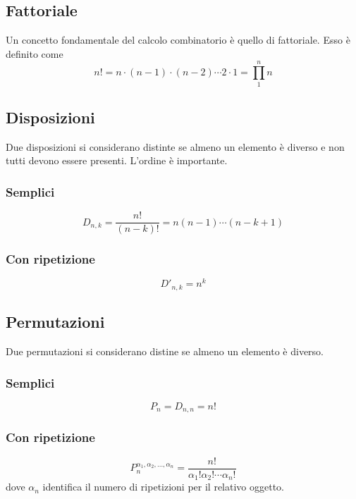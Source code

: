 \subsection{Fattoriale}
Un concetto fondamentale del calcolo combinatorio è quello di fattoriale. Esso è definito come
\begin{equation*}
n! = n\cdot (n-1) \cdot (n-2) \dotsm 2\cdot1 = \prod\limits_{1}^{n}n
\end{equation*}

\subsection{Disposizioni}
Due disposizioni si considerano distinte se almeno un elemento è diverso e non tutti devono essere 
presenti. L'ordine è importante.

\subsubsection{Semplici}
\begin{equation*}
D_{n,k} = \frac{n!}{(n-k)!} = n(n-1)\dotsm(n-k+1)
\end{equation*}

\subsubsection{Con ripetizione}
\begin{equation*}
D'_{n,k} = n^k
\end{equation*}

\subsection{Permutazioni}
Due permutazioni si considerano distine se almeno un elemento è diverso.

\subsubsection{Semplici}
\begin{equation*}
P_n = D_{n,n} = n!
\end{equation*}

\subsubsection{Con ripetizione}
\begin{equation*}
P_n^{\alpha_1,\alpha_2,\dotsc,\alpha_n} = \frac{n!}{\alpha_1!\alpha_2!\dotsm\alpha_n!}
\end{equation*}
dove $\alpha_n$ identifica il numero di ripetizioni per il relativo oggetto.

